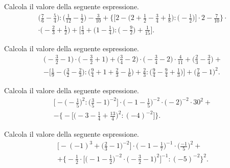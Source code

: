 \begin{esercizio}[\Ast]%
 Calcola il valore della seguente espressione.
\begin{multline*}
\bigg(\frac{7}{6}-\frac{5}{4}\bigg):\bigg(\frac{1}{12}-\frac{1}{2}\bigg)-\frac{3}{10}+\bigg\{\bigg[2-\bigg(2+\frac{1}{2}%
-\frac{3}{4}+\frac{1}{8}\bigg):\bigg(-{\frac{1}{2}}\bigg)\bigg]\cdot2-\frac{7}{10}\bigg\}\cdot\\
\cdot\bigg(-{\frac{2}{3}}+\frac{1}{2}\bigg)%
+\bigg[\frac{1}{3}+\bigg(1-\frac{1}{4}\bigg):\bigg(-{\frac{9}{2}}\bigg)+\frac{1}{15}\bigg].
\end{multline*}
\end{esercizio}

\begin{esercizio}[\Ast]%
 Calcola il valore della seguente espressione.
\begin{multline*}
\bigg(-{\frac{3}{2}}-1\bigg)\cdot%
\bigg(-{\frac{3}{2}}+1\bigg)+\bigg(\frac{3}{4}-2\bigg)\cdot%
\bigg(-{\frac{3}{4}}-2\bigg)\cdot {\frac{4}{11}}+\bigg(\frac{2}{3}-\frac{3}{4}\bigg)+\\%
-\bigg[\frac{1}{9}-\bigg(\frac{3}{2}-\frac{2}{3}\bigg):\bigg(\frac{9}{4}+1+%
\frac{2}{3}-\frac{1}{6}\bigg)+\frac{2}{3}:\bigg(\frac{9}{4}-\frac{9}{4}%
+\frac{1}{3}\bigg)\bigg]+\bigg(\frac{7}{6}-1\bigg)^{2}.
\end{multline*}
\end{esercizio}

\begin{esercizio}[\Ast]%
 Calcola il valore della seguente espressione.
\begin{multline*}
\bigg[-\bigg(-{\frac{1}{5}}\bigg)^{2}:\bigg(\frac{3}{5}-1\bigg)^{-2}\bigg]\cdot%
\bigg(-1-\frac{1}{5}\bigg)^{-2}\cdot \bigg(-2\bigg)^{-2}\cdot30^{2}+\\%
-\bigg\{-\bigg[\bigg(-3-\frac{1}{4}+\frac{13}{4}\bigg)^{2}:(-4)^{-2}\bigg]\bigg\}.
\end{multline*}
\end{esercizio}

\begin{esercizio}[\Ast]%
 Calcola il valore della seguente espressione.
\begin{multline*}
\bigg[-(-1)^{3}+\bigg(\frac{2}{3}-1\bigg)^{-2}\bigg]\cdot\bigg(-1-\frac{1}{7}\bigg)^{-1}\cdot%
\bigg(\frac{-1}{5}\bigg)^{2}+\\%
+\bigg\{-{\frac{1}{2}}\cdot\bigg[\bigg(-1-\frac{1}{2}\bigg)^{-2}\cdot%
\bigg(-{\frac{3}{2}}-1\bigg)^{2}\bigg]^{-1}:(-5)^{-2}\bigg\}^{2}.
\end{multline*}
\end{esercizio}

